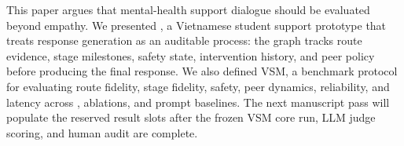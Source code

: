This paper argues that mental-health support dialogue should be evaluated beyond empathy. We presented \trace, a Vietnamese student support prototype that treats response generation as an auditable process: the graph tracks route evidence, stage milestones, safety state, intervention history, and peer policy before producing the final response. We also defined VSM, a benchmark protocol for evaluating route fidelity, stage fidelity, safety, peer dynamics, reliability, and latency across \trace, ablations, and prompt baselines. The next manuscript pass will populate the reserved result slots after the frozen VSM core run, LLM judge scoring, and human audit are complete.
